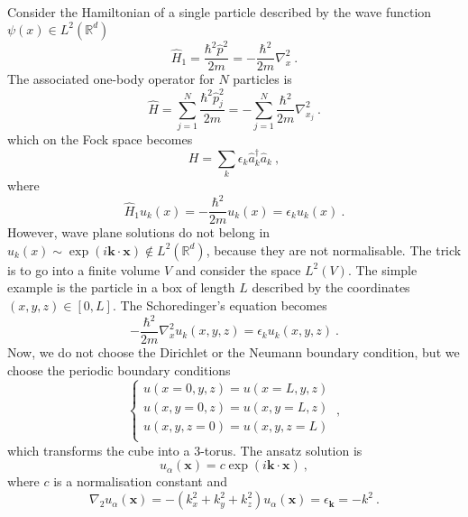     Consider the Hamiltonian of a single particle described by the wave function $\psi (x) \in L^2 (\mathbb R^d)$ 
    \begin{equation*}
        \hat H_1 = \frac{\hbar^2 \hat p^2}{2m} = - \frac{\hbar^2}{2m} \nabla_x^2 ~.
    \end{equation*}
    The associated one-body operator for $N$ particles is 
    \begin{equation*}
        \hat H = \sum_{j = 1}^{N} \frac{\hbar^2 \hat p_j^2}{2m} = - \sum_{j = 1}^{N} \frac{\hbar^2}{2m} \nabla^2_{x_j} ~.
    \end{equation*}
    which on the Fock space becomes
    \begin{equation*}
        H = \sum_k \epsilon_k \hat a_k^\dagger \hat a_k ~,
    \end{equation*}
    where 
    \begin{equation*}
        \hat H_1 u_k (x) = - \frac{\hbar^2}{2m} u_k (x) = \epsilon_k u_k (x) ~.
    \end{equation*}
    However, wave plane solutions do not belong in $u_k(x) \sim \exp(i \mathbf k \cdot \mathbf x) \notin L^2 (\mathbb R^d)$, because they are not normalisable. The trick is to go into a finite volume $V$ and consider the space $L^2(V)$. The simple example is the particle in a box of length $L$ described by the coordinates $(x,y,z) \in [0, L]$. The Schoredinger's equation becomes 
    \begin{equation*}
        - \frac{\hbar^2}{2m} \nabla_x^2 u_k (x,y,z) = \epsilon_k u_k (x,y,z) ~.
    \end{equation*}
    Now, we do not choose the Dirichlet or the Neumann boundary condition, but we choose the periodic boundary conditions 
    \begin{equation*}
        \begin{cases}
            u(x=0, y, z) = u(x = L, y, z) \\
            u(x, y=0, z) = u(x, y=L, z) \\
            u(x, y, z=0) = u(x, y, z=L) \\
        \end{cases} ~,
    \end{equation*}
    which transforms the cube into a $3$-torus.
    The ansatz solution is 
    \begin{equation*}
        u_\alpha (\mathbf x) = c \exp(i \mathbf k \cdot \mathbf x) ~,
    \end{equation*}
    where $c$ is a normalisation constant and 
    \begin{equation*}
        \nabla_2 u_\alpha (\mathbf x) = - (k_x^2 + k_y^2 + k_z^2) u_\alpha (\mathbf x) = \epsilon_{\mathbf k} = - k^2 ~.
    \end{equation*}
